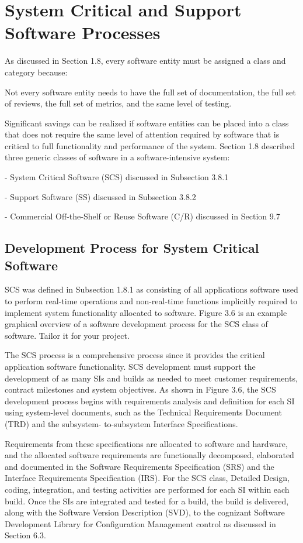 \documentclass{book}
\begin{document}
\section{System Critical and Support Software Processes}
As discussed in Section 1.8, every software entity must be
assigned a class and category because:

Not every software entity needs to have the full set
of documentation, the full set of reviews, the full set
of metrics, and the same level of testing.

Significant savings can be realized if software entities can
be placed into a class that does not require the same level of
attention required by software that is critical to full functionality
and performance of the system. Section 1.8 described
three generic classes of software in a software-intensive system:

- System Critical Software (SCS) discussed in Subsection
3.8.1

- Support Software (SS) discussed in Subsection 3.8.2

- Commercial Off-the-Shelf or Reuse Software (C/R) discussed
in Section 9.7

\subsection{Development Process for System Critical Software}
SCS was defined in Subsection 1.8.1 as consisting of all
applications software used to perform real-time operations
and non-real-time functions implicitly required to implement
system functionality allocated to software. Figure 3.6 is an
example graphical overview of a software development process
for the SCS class of software. Tailor it for your project.

The SCS process is a comprehensive process since it provides
the critical application software functionality. SCS
development must support the development of as many SIs
and builds as needed to meet customer requirements, contract
milestones and system objectives. As shown in Figure 3.6, the
SCS development process begins with requirements analysis
and definition for each SI using system-level documents, such
as the Technical Requirements Document (TRD) and the subsystem-
to-subsystem Interface Specifications.

Requirements from these specifications are allocated to
software and hardware, and the allocated software requirements
are functionally decomposed, elaborated and documented
in the Software Requirements Specification (SRS)
and the Interface Requirements Specification (IRS). For the
SCS class, Detailed Design, coding, integration, and testing
activities are performed for each SI within each build.
Once the SIs are integrated and tested for a build, the build
is delivered, along with the Software Version Description
(SVD), to the cognizant Software Development Library
for Configuration Management control as discussed in
Section 6.3.
\end{document}
